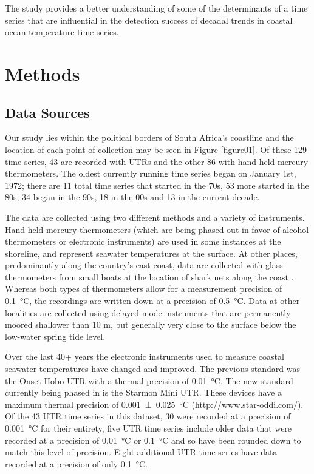 \documentclass[]{ametsoc}
\begin{document}
The study provides a better understanding of some of the determinants of a time series that are influential in the detection success of decadal trends in coastal ocean temperature time series.

\section{Methods}

\subsection{Data Sources}
Our study lies within the political borders of South Africa's coastline and the location of each point of collection may be seen in Figure \ref{figure01}. Of these 129 time series, 43 are recorded with UTRs and the other 86 with hand-held mercury thermometers. The oldest currently running time series began on January 1st, 1972; there are 11 total time series that started in the 70s, 53 more started in the 80s, 34 began in the 90s, 18 in the 00s and 13 in the current decade.

The data are collected using two different methods and a variety of instruments. Hand-held mercury thermometers (which are being phased out in favor of alcohol thermometers or electronic instruments) are used in some instances at the shoreline, and represent seawater temperatures at the surface. At other places, predominantly along the country's east coast, data are collected with glass thermometers from small boats at the location of shark nets along the coast \citep{Cliff1988}. Whereas both types of thermometers allow for a measurement precision of \SI{0.1}{\degreeCelsius}, the recordings are written down at a precision of \SI{0.5}{\degreeCelsius}. Data at other localities are collected using delayed-mode instruments that are permanently moored shallower than 10 m, but generally very close to the surface below the low-water spring tide level.

Over the last 40+ years the electronic instruments used to measure coastal seawater temperatures have changed and improved. The previous standard was the Onset Hobo UTR with a thermal precision of \SI{0.01}{\degreeCelsius}. The new standard currently being phased in is the Starmon Mini UTR. These devices have a maximum thermal precision of \SI[separate-uncertainty = true, multi-part-units = repeat]{0.001(25)}{\degreeCelsius} (http://www.star-oddi.com/). Of the 43 UTR time series in this dataset, 30 were recorded at a precision of \SI{0.001}{\degreeCelsius} for their entirety, five UTR time series include older data that were recorded at a precision of \SI{0.01}{\degreeCelsius} or \SI{0.1}{\degreeCelsius} and so have been rounded down to match this level of precision. Eight additional UTR time series have data recorded at a precision of only \SI{0.1}{\degreeCelsius}.
\end{document}
